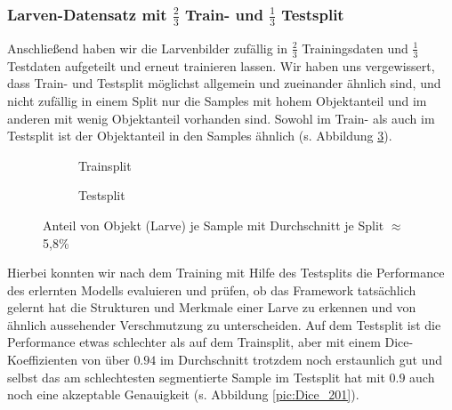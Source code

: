 \subsubsection{Larven-Datensatz mit $\frac{2}{3}$ Train- und $\frac{1}{3}$ Testsplit}
Anschließend haben wir die Larvenbilder zufällig in $\frac{2}{3}$ Trainingsdaten und $\frac{1}{3}$ Testdaten aufgeteilt und erneut trainieren lassen. Wir haben uns vergewissert, dass Train- und Testsplit möglichst allgemein und zueinander ähnlich sind, und nicht zufällig in einem Split nur die Samples mit hohem Objektanteil und im anderen mit wenig Objektanteil vorhanden sind. Sowohl im Train- als auch im Testsplit ist der Objektanteil in den Samples ähnlich (s. Abbildung \ref{pic:Haeuf_201}).
\begin{figure}[H]
\begin{minipage}{.5\textwidth}
\begin{subfigure}{\textwidth}

\caption{Trainsplit}
\label{pic:Haeuf-Train_201}
\end{subfigure}
\end{minipage}
\begin{minipage}{.5\textwidth}
\begin{subfigure}{\textwidth}

\caption{Testsplit}
\label{pic:Haeuf-Test_201}
\end{subfigure}
\end{minipage}
\caption{Anteil von Objekt (Larve) je Sample mit Durchschnitt je Split $\approx$ 5,8\%}
\label{pic:Haeuf_201}
\end{figure}

Hierbei konnten wir nach dem Training mit Hilfe des Testsplits die Performance des erlernten Modells evaluieren und prüfen, ob das Framework tatsächlich gelernt hat die Strukturen und Merkmale einer Larve zu erkennen und von ähnlich aussehender Verschmutzung zu unterscheiden. Auf dem Testsplit ist die Performance etwas schlechter als auf dem Trainsplit, aber mit einem Dice-Koeffizienten von über $0.94$ im Durchschnitt trotzdem noch erstaunlich gut und selbst das am schlechtesten segmentierte Sample im Testsplit hat mit $0.9$ auch noch eine akzeptable Genauigkeit (s. Abbildung \ref{pic:Dice_201}).

